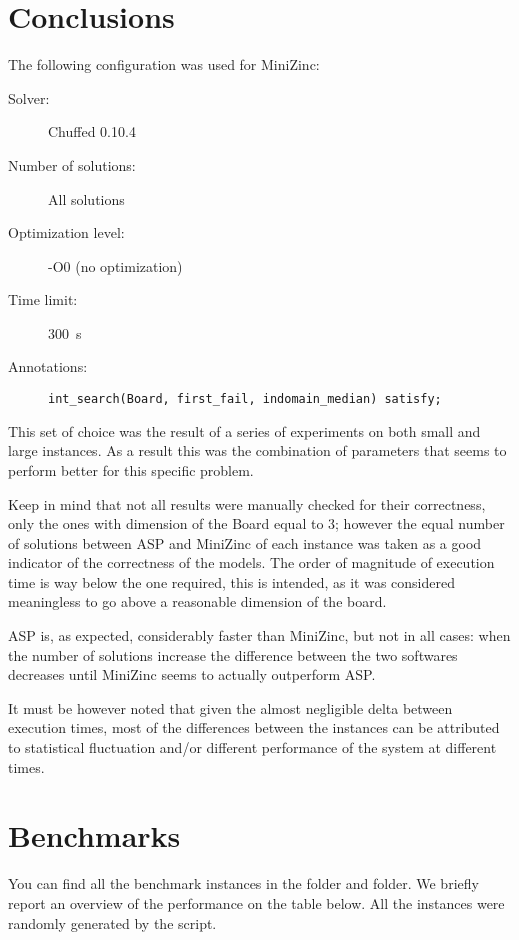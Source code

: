 \section{Conclusions}
The following configuration was used for MiniZinc:
\begin{description}
    \item[Solver: ] Chuffed 0.10.4
    \item[Number of solutions: ] All solutions
    \item[Optimization level: ] -O0 (no optimization)
    \item[Time limit: ] \SI{300}{s}
    \item[Annotations: ] \texttt{int_search(Board, first_fail, indomain_median) satisfy;}
\end{description}

This set of choice was the result of a series of experiments on both small and large instances. As a result this was the combination of parameters that seems to perform better for this specific problem.

Keep in mind that not all results were manually checked for their correctness, only the ones with dimension of the Board equal to 3; however the equal number of solutions between ASP and MiniZinc of each instance was taken as a good indicator of the correctness of the models.
The order of magnitude of execution time is way below the one required, this is intended, as it was considered meaningless to go above a reasonable dimension of the board.

ASP is, as expected, considerably faster than MiniZinc, but not in all cases: when the number of solutions increase the difference between the two softwares decreases until MiniZinc seems to actually outperform ASP. 

It must be however noted that given the almost negligible delta between execution times, most of the differences between the instances can be attributed to statistical fluctuation and/or different performance of the system at different times.

\section{Benchmarks}\label{sec:benchmarks}
You can find all the benchmark instances in the  folder and  folder. We briefly report an overview of the performance on the table below. All the instances were randomly generated by the script.




